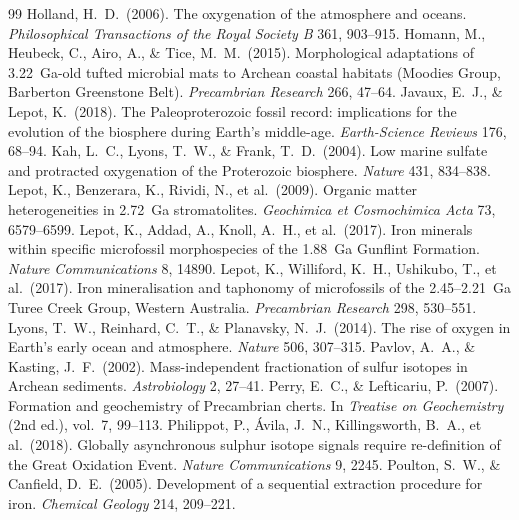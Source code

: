 \documentclass[11pt]{article}
\begin{document}
\begin{thebibliography}{99}
 Holland, H.~D.\ (2006). The oxygenation of the atmosphere and
oceans. \textit{Philosophical Transactions of the Royal Society B} 361, 903--915.
 Homann, M., Heubeck, C., Airo, A., \& Tice, M.~M.\ (2015).
Morphological adaptations of 3.22~Ga-old tufted microbial mats to Archean coastal habitats (Moodies
Group, Barberton Greenstone Belt). \textit{Precambrian Research} 266, 47--64.
 Javaux, E.~J., \& Lepot, K.\ (2018). The Paleoproterozoic
fossil record: implications for the evolution of the biosphere during Earth's middle-age.
\textit{Earth-Science Reviews} 176, 68--94.
 Kah, L.~C., Lyons, T.~W., \& Frank, T.~D.\ (2004). Low marine
sulfate and protracted oxygenation of the Proterozoic biosphere. \textit{Nature} 431, 834--838.
 Lepot, K., Benzerara, K., Rividi, N., et al.\ (2009). Organic
matter heterogeneities in 2.72~Ga stromatolites. \textit{Geochimica et Cosmochimica Acta} 73,
6579--6599.
 Lepot, K., Addad, A., Knoll, A.~H., et al.\ (2017). Iron
minerals within specific microfossil morphospecies of the 1.88~Ga Gunflint Formation. \textit{Nature
Communications} 8, 14890.
 Lepot, K., Williford, K.~H., Ushikubo, T., et al.\ (2017).
Iron mineralisation and taphonomy of microfossils of the 2.45--2.21~Ga Turee Creek Group, Western
Australia. \textit{Precambrian Research} 298, 530--551.
 Lyons, T.~W., Reinhard, C.~T., \& Planavsky, N.~J.\ (2014).
The rise of oxygen in Earth's early ocean and atmosphere. \textit{Nature} 506, 307--315.
 Pavlov, A.~A., \& Kasting, J.~F.\ (2002).
Mass-independent fractionation of sulfur isotopes in Archean sediments. \textit{Astrobiology} 2,
27--41.
 Perry, E.~C., \& Lefticariu, P.\ (2007). Formation and
geochemistry of Precambrian cherts. In \textit{Treatise on Geochemistry} (2nd ed.), vol.~7, 99--113.
 Philippot, P., \'{A}vila, J.~N., Killingsworth, B.~A.,
et al.\ (2018). Globally asynchronous sulphur isotope signals require re-definition of the Great
Oxidation Event. \textit{Nature Communications} 9, 2245.
 Poulton, S.~W., \& Canfield, D.~E.\ (2005).
Development of a sequential extraction procedure for iron. \textit{Chemical Geology} 214, 209--221.

\end{thebibliography}
\end{document}
